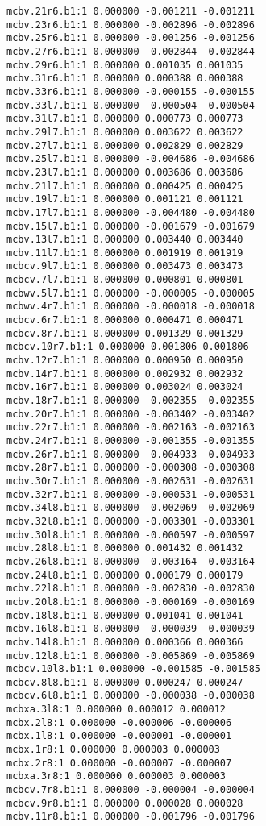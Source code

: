 \begin{verbatim}
mcbv.21r6.b1:1 0.000000 -0.001211 -0.001211
mcbv.23r6.b1:1 0.000000 -0.002896 -0.002896
mcbv.25r6.b1:1 0.000000 -0.001256 -0.001256
mcbv.27r6.b1:1 0.000000 -0.002844 -0.002844
mcbv.29r6.b1:1 0.000000 0.001035 0.001035
mcbv.31r6.b1:1 0.000000 0.000388 0.000388
mcbv.33r6.b1:1 0.000000 -0.000155 -0.000155
mcbv.33l7.b1:1 0.000000 -0.000504 -0.000504
mcbv.31l7.b1:1 0.000000 0.000773 0.000773
mcbv.29l7.b1:1 0.000000 0.003622 0.003622
mcbv.27l7.b1:1 0.000000 0.002829 0.002829
mcbv.25l7.b1:1 0.000000 -0.004686 -0.004686
mcbv.23l7.b1:1 0.000000 0.003686 0.003686
mcbv.21l7.b1:1 0.000000 0.000425 0.000425
mcbv.19l7.b1:1 0.000000 0.001121 0.001121
mcbv.17l7.b1:1 0.000000 -0.004480 -0.004480
mcbv.15l7.b1:1 0.000000 -0.001679 -0.001679
mcbv.13l7.b1:1 0.000000 0.003440 0.003440
mcbv.11l7.b1:1 0.000000 0.001919 0.001919
mcbcv.9l7.b1:1 0.000000 0.003473 0.003473
mcbcv.7l7.b1:1 0.000000 0.000801 0.000801
mcbwv.5l7.b1:1 0.000000 -0.000005 -0.000005
mcbwv.4r7.b1:1 0.000000 -0.000018 -0.000018
mcbcv.6r7.b1:1 0.000000 0.000471 0.000471
mcbcv.8r7.b1:1 0.000000 0.001329 0.001329
mcbcv.10r7.b1:1 0.000000 0.001806 0.001806
mcbv.12r7.b1:1 0.000000 0.000950 0.000950
mcbv.14r7.b1:1 0.000000 0.002932 0.002932
mcbv.16r7.b1:1 0.000000 0.003024 0.003024
mcbv.18r7.b1:1 0.000000 -0.002355 -0.002355
mcbv.20r7.b1:1 0.000000 -0.003402 -0.003402
mcbv.22r7.b1:1 0.000000 -0.002163 -0.002163
mcbv.24r7.b1:1 0.000000 -0.001355 -0.001355
mcbv.26r7.b1:1 0.000000 -0.004933 -0.004933
mcbv.28r7.b1:1 0.000000 -0.000308 -0.000308
mcbv.30r7.b1:1 0.000000 -0.002631 -0.002631
mcbv.32r7.b1:1 0.000000 -0.000531 -0.000531
mcbv.34l8.b1:1 0.000000 -0.002069 -0.002069
mcbv.32l8.b1:1 0.000000 -0.003301 -0.003301
mcbv.30l8.b1:1 0.000000 -0.000597 -0.000597
mcbv.28l8.b1:1 0.000000 0.001432 0.001432
mcbv.26l8.b1:1 0.000000 -0.003164 -0.003164
mcbv.24l8.b1:1 0.000000 0.000179 0.000179
mcbv.22l8.b1:1 0.000000 -0.002830 -0.002830
mcbv.20l8.b1:1 0.000000 -0.000169 -0.000169
mcbv.18l8.b1:1 0.000000 0.001041 0.001041
mcbv.16l8.b1:1 0.000000 -0.000039 -0.000039
mcbv.14l8.b1:1 0.000000 0.000366 0.000366
mcbv.12l8.b1:1 0.000000 -0.005869 -0.005869
mcbcv.10l8.b1:1 0.000000 -0.001585 -0.001585
mcbcv.8l8.b1:1 0.000000 0.000247 0.000247
mcbcv.6l8.b1:1 0.000000 -0.000038 -0.000038
mcbxa.3l8:1 0.000000 0.000012 0.000012
mcbx.2l8:1 0.000000 -0.000006 -0.000006
mcbx.1l8:1 0.000000 -0.000001 -0.000001
mcbx.1r8:1 0.000000 0.000003 0.000003
mcbx.2r8:1 0.000000 -0.000007 -0.000007
mcbxa.3r8:1 0.000000 0.000003 0.000003
mcbcv.7r8.b1:1 0.000000 -0.000004 -0.000004
mcbcv.9r8.b1:1 0.000000 0.000028 0.000028
mcbv.11r8.b1:1 0.000000 -0.001796 -0.001796

\end{verbatim}
